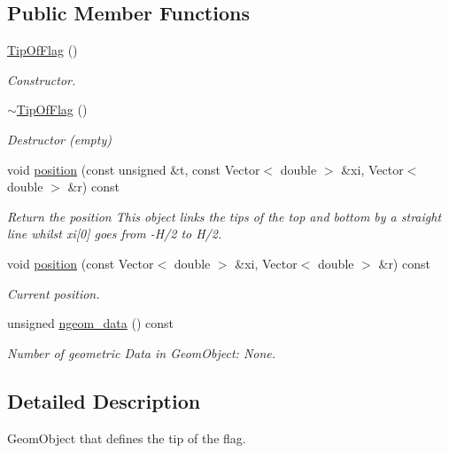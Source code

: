 \subsection*{Public Member Functions}
\begin{DoxyCompactItemize}
\item 
\hyperlink{classFlag__definition_1_1TipOfFlag_a7a43bdfc369a833e161a75d29b95ff01}{Tip\+Of\+Flag} ()
\begin{DoxyCompactList}\small\item\em Constructor. \end{DoxyCompactList}\item 
\hyperlink{classFlag__definition_1_1TipOfFlag_a9aa1a8091a79925dc6542ab2c03d583a}{$\sim$\+Tip\+Of\+Flag} ()
\begin{DoxyCompactList}\small\item\em Destructor (empty) \end{DoxyCompactList}\item 
void \hyperlink{classFlag__definition_1_1TipOfFlag_afcc0a2176290bbb7d1bb4adf9c231991}{position} (const unsigned \&t, const Vector$<$ double $>$ \&xi, Vector$<$ double $>$ \&r) const
\begin{DoxyCompactList}\small\item\em Return the position This object links the tips of the top and bottom by a straight line whilst xi\mbox{[}0\mbox{]} goes from -\/\+H/2 to H/2. \end{DoxyCompactList}\item 
void \hyperlink{classFlag__definition_1_1TipOfFlag_ae4e08c72baeaca1fe62bca6f36262fa7}{position} (const Vector$<$ double $>$ \&xi, Vector$<$ double $>$ \&r) const
\begin{DoxyCompactList}\small\item\em Current position. \end{DoxyCompactList}\item 
unsigned \hyperlink{classFlag__definition_1_1TipOfFlag_a7571a5cbebe6de6c4ee42de5f2fe3dd8}{ngeom\+\_\+data} () const
\begin{DoxyCompactList}\small\item\em Number of geometric Data in Geom\+Object\+: None. \end{DoxyCompactList}\end{DoxyCompactItemize}


\subsection{Detailed Description}
Geom\+Object that defines the tip of the flag. 

